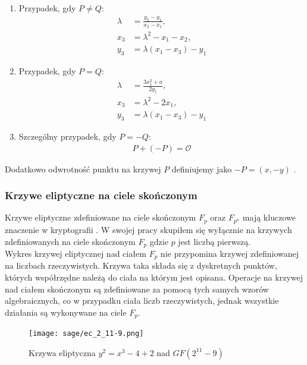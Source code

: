 \begin{enumerate}
    \item Przypadek, gdy \( P \neq Q \):
          \begin{align}
              \lambda & = \frac{y_2 - y_1}{x_2 - x_1}, \\
              x_3     & = \lambda^2 - x_1 - x_2,       \\
              y_3     & = \lambda(x_1 - x_3) - y_1
          \end{align}
    \item Przypadek, gdy \( P = Q \):
          \begin{align*}
              \lambda & = \frac{3x_1^2 + a}{2y_1}, \\
              x_3     & = \lambda^2 - 2x_1,        \\
              y_3     & = \lambda(x_1 - x_3) - y_1
          \end{align*}
    \item Szczególny przypadek, gdy \( P = -Q \):
          \begin{align*}
              P + (-P) = \mathcal{O}
          \end{align*}
\end{enumerate}
Dodatkowo odwrotność punktu na krzywej $P$ definiujemy jako $-P = (x, -y)$ \cite{Stinson2021}.


\subsubsection{Krzywe eliptyczne na ciele skończonym}
Krzywe eliptyczne zdefiniowane na ciele skończonym $F_p$ oraz $F_{p^n}$ mają kluczowe znaczenie w kryptografii \cite{Stinson2021}.
W swojej pracy skupiłem się wyłącznie na krzywych zdefiniowanych na ciele skończonym $F_p$ gdzie $p$ jest liczbą pierwszą. \\
Wykres krzywej eliptycznej nad ciałem $F_p$ nie przypomina krzywej zdefiniowanej na liczbach rzeczywistych.
Krzywa taka składa się z dyskretnych punktów, których współrzędne należą do ciała
na którym jest opisana.
Operacje na krzywej nad ciałem skończonym są zdefiniowane
za pomocą tych samych wzorów algebraicznych, co w przypadku ciała liczb rzeczywistych,
jednak wszystkie działania są wykonywane na ciele $F_p$.
\begin{figure}[!h]
    \centering \texttt{[image: sage/ec\_2\_11-9.png]}
    \caption{Krzywa eliptyczna $y^2=x^3-4+2$ nad $GF(2^{11} - 9)$}
\end{figure}


